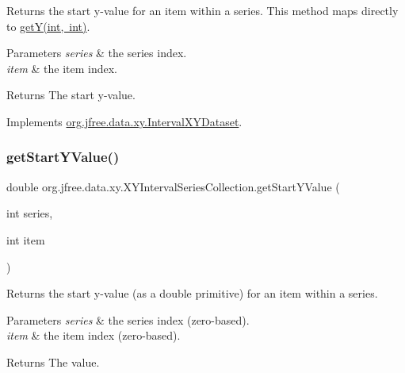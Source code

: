 Returns the start y-\/value for an item within a series. This method maps directly to \mbox{\hyperlink{classorg_1_1jfree_1_1data_1_1xy_1_1_x_y_interval_series_collection_a466c1c681b804f65c56985ea65ec2a20}{get\+Y(int, int)}}.


\begin{DoxyParams}{Parameters}
{\em series} & the series index. \\
\hline
{\em item} & the item index.\\
\hline
\end{DoxyParams}
\begin{DoxyReturn}{Returns}
The start y-\/value. 
\end{DoxyReturn}


Implements \mbox{\hyperlink{interfaceorg_1_1jfree_1_1data_1_1xy_1_1_interval_x_y_dataset_afdd414735adb233734bc35b76a005ed9}{org.\+jfree.\+data.\+xy.\+Interval\+X\+Y\+Dataset}}.

\mbox{\label{classorg_1_1jfree_1_1data_1_1xy_1_1_x_y_interval_series_collection_ac95d13ee5b7dd702f9a9fdf7f78a79e9}} 
\subsubsection{\texorpdfstring{get\+Start\+Y\+Value()}{getStartYValue()}}
{\footnotesize\ttfamily double org.\+jfree.\+data.\+xy.\+X\+Y\+Interval\+Series\+Collection.\+get\+Start\+Y\+Value (\begin{DoxyParamCaption}\item[{int}]{series,  }\item[{int}]{item }\end{DoxyParamCaption})}

Returns the start y-\/value (as a double primitive) for an item within a series.


\begin{DoxyParams}{Parameters}
{\em series} & the series index (zero-\/based). \\
\hline
{\em item} & the item index (zero-\/based).\\
\hline
\end{DoxyParams}
\begin{DoxyReturn}{Returns}
The value. 
\end{DoxyReturn}


